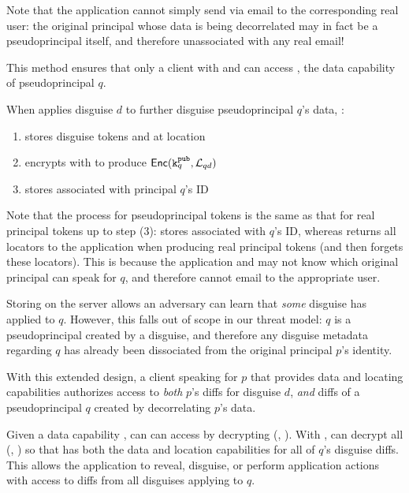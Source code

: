 Note that the application cannot simply send  via \eg email to the corresponding
real user: the original principal whose data is being decorrelated may in fact be a pseudoprincipal
itself, and therefore unassociated with any real email!

This method ensures that only a client with  and  can access , the data
capability of pseudoprincipal $q$. 

When \sys applies disguise $d$ to further disguise pseudoprincipal $q$'s data, \sys:
\begin{enumerate}
    \item stores disguise tokens  and  at location 
    \item encrypts  with  to produce $\mathsf{Enc}(\texttt{\ensuremath{\texttt{k}^{\text{pub}}_{q}}}, \mathcal{L}_{qd})$
    \item stores  associated with principal $q$'s ID
\end{enumerate}
Note that the process for pseudoprincipal tokens is the same as that for real principal tokens up to
step (3): \sys stores  associated with $q$'s ID, whereas \sys returns all locators to
the application when producing real principal tokens (and then forgets these locators).
This is because the application and \sys may not know which original principal can speak for $q$,
and therefore cannot \eg email  to the appropriate user.

Storing  on the server allows an adversary can learn that \emph{some} disguise has
applied to $q$. However, this falls out of scope in our threat model: $q$ is a pseudoprincipal
created by a disguise, and therefore any disguise metadata regarding $q$ has already been
dissociated from the original principal $p$'s identity.

With this extended design, a client speaking for $p$ that provides data and locating capabilities%
authorizes access to \emph{both} $p$'s diffs for disguise $d$, \emph{and}
diffs of a pseudoprincipal $q$ created by
decorrelating $p$'s data. 

Given a data capability , \sys can can access  by decrypting \enc(,
).
%
With , \sys can decrypt all \enc(, ) so that \sys has both the data and
location capabilities for all of $q$'s disguise diffs. This allows the application to reveal,
disguise, or perform application actions with access to diffs from all disguises applying to $q$.

